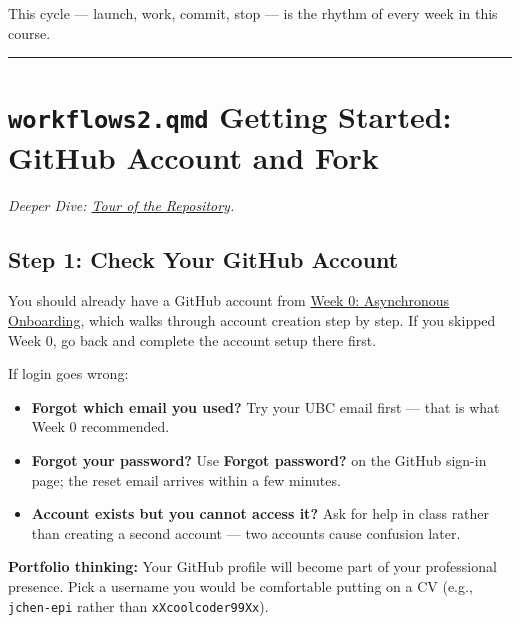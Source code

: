 \documentclass[
  letterpaper,
  DIV=11,
  numbers=noendperiod,
  oneside]{scrreprt}
\providecommand{\tightlist}{%
  \setlength{\itemsep}{0pt}\setlength{\parskip}{0pt}}
\begin{document}
This cycle --- launch, work, commit, stop --- is the rhythm of every
week in this course.

\begin{center}\rule{0.5\linewidth}{0.5pt}\end{center}

\section*{\texorpdfstring{\texttt{workflows2.qmd} Getting Started:
GitHub Account and
Fork}{workflows2.qmd Getting Started: GitHub Account and Fork}}\label{workflows2.qmd-getting-started-github-account-and-fork}


\emph{Deeper Dive: \href{workflows02-repository-tour.qmd}{Tour of the
Repository}.}

\subsection*{Step 1: Check Your GitHub
Account}\label{step-1-check-your-github-account}

You should already have a GitHub account from
\hyperref[week-0-asynchronous-onboarding-1]{Week 0: Asynchronous
Onboarding}, which walks through account creation step by step. If you
skipped Week 0, go back and complete the account setup there first.

If login goes wrong:

\begin{itemize}
\tightlist
\item
  \textbf{Forgot which email you used?} Try your UBC email first ---
  that is what Week 0 recommended.
\item
  \textbf{Forgot your password?} Use \textbf{Forgot password?} on the
  GitHub sign-in page; the reset email arrives within a few minutes.
\item
  \textbf{Account exists but you cannot access it?} Ask for help in
  class rather than creating a second account --- two accounts cause
  confusion later.
\end{itemize}

\begin{tcolorbox}[enhanced jigsaw, title=\textcolor{quarto-callout-tip-color}{\faLightbulb}\hspace{0.5em}{Tip}, arc=.35mm, toptitle=1mm, colframe=quarto-callout-tip-color-frame, toprule=.15mm, leftrule=.75mm, bottomtitle=1mm, opacityback=0, bottomrule=.15mm, coltitle=black, breakable, opacitybacktitle=0.6, titlerule=0mm, colback=white, left=2mm, colbacktitle=quarto-callout-tip-color!10!white, rightrule=.15mm]

\textbf{Portfolio thinking:} Your GitHub profile will become part of
your professional presence. Pick a username you would be comfortable
putting on a CV (e.g., \texttt{jchen-epi} rather than
\texttt{xXcoolcoder99Xx}).

\end{tcolorbox}
\end{document}
